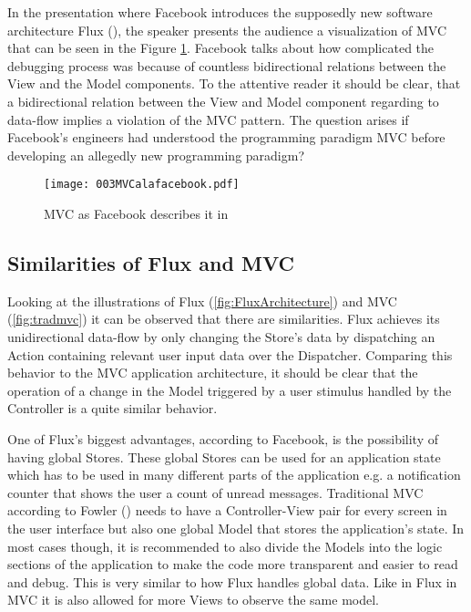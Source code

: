 In the presentation where Facebook introduces the supposedly new software architecture Flux (\cite{youtube.2014}), the speaker presents the audience a visualization of MVC that can be seen in the Figure \ref{fig:mvcalafacebook}. Facebook talks about how complicated the debugging process was because of countless bidirectional relations between the View and the Model components. To the attentive reader it should be clear, that a bidirectional relation between the View and Model component regarding to data-flow implies a violation of the MVC pattern. The question arises if Facebook's engineers had understood the programming paradigm MVC before developing an allegedly new programming paradigm?


\begin{figure}
  \centering
  \texttt{[image: 003MVCalafacebook.pdf]}
  \caption{MVC as Facebook describes it in \cite[11:10]{youtube.2014}}
  \label{fig:mvcalafacebook}
\end{figure}

\subsection{Similarities of Flux and MVC}

Looking at the illustrations of Flux (\ref{fig:FluxArchitecture}) and MVC (\ref{fig:tradmvc}) it can be observed that there are similarities. Flux achieves its unidirectional data-flow by only changing the Store's data by dispatching an Action containing relevant user input data over the Dispatcher. Comparing this behavior to the MVC application architecture, it should be clear that the operation of a change in the Model triggered by a user stimulus handled by the Controller is a quite similar behavior.

One of Flux's biggest advantages, according to Facebook, is the possibility of having global Stores. These global Stores can be used for an application state which has to be used in many different parts of the application e.g. a notification counter that shows the user a count of unread messages. Traditional MVC according to Fowler (\cite[\#ModelViewContoller]{MartinFowler.2006}) needs to have a Controller-View pair for every screen in the user interface but also one global Model that stores the application's state. In most cases though, it is recommended to also divide the Models into the logic sections of the application to make the code more transparent and easier to read and debug. This is very similar to how Flux handles global data. Like in Flux in MVC it is also allowed for more Views to observe the same model.

